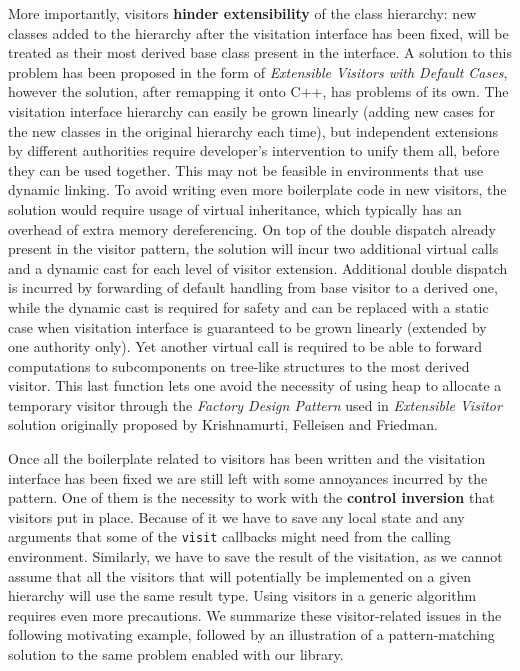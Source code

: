 \documentclass[preprint]{sigplanconf}
\makeatletter
\DeclareRobustCommand{\code}[1]{{\lstinline[breaklines=false,escapechar=@]{#1}}}
\makeatother
\begin{document}
More importantly, visitors {\bf hinder extensibility} of the class hierarchy: 
new classes added to the hierarchy after the visitation interface has been 
fixed, will be treated as their most derived base class present in the interface.
A solution to this problem has been proposed in the form of \emph{Extensible 
Visitors with Default Cases}\cite[]{Zenger:2001}, however the solution, after 
remapping it onto C++, has problems of its own. The visitation interface 
hierarchy can easily be grown linearly (adding new cases for the new classes in 
the original hierarchy each time), but independent extensions by different  
authorities require developer's intervention to unify them all, before they can 
be used together. This may not be feasible in environments that use dynamic 
linking. To avoid writing even more boilerplate code in new visitors, the 
solution would require usage of virtual inheritance, which typically has 
an overhead of extra memory dereferencing. On top of the double dispatch already 
present in the visitor pattern, the solution will incur two additional virtual 
calls and a dynamic cast for each level of visitor extension. Additional double 
dispatch is incurred by forwarding of default handling from base visitor to a 
derived one, while the dynamic cast is required for safety and can be replaced 
with a static case when visitation interface is guaranteed to be grown linearly 
(extended by one authority only). Yet another virtual call is required to be 
able to forward computations to subcomponents on tree-like structures to the 
most derived visitor. This last function lets one avoid the necessity of using 
heap to allocate a temporary visitor through the \emph{Factory Design 
Pattern}\cite{DesignPatterns1993} used in \emph{Extensible Visitor} solution 
originally proposed by Krishnamurti, Felleisen and Friedman\cite{Krishnamurthi98}.

Once all the boilerplate related to visitors has been written and the visitation 
interface has been fixed we are still left with some annoyances incurred by the 
pattern. One of them is the necessity to work with the {\bf control inversion} 
that visitors put in place. Because of it we have to save any local state and 
any arguments that some of the \code{visit} callbacks might need from the 
calling environment. Similarly, we have to save the result of the visitation, 
as we cannot assume that all the visitors that will potentially be implemented 
on a given hierarchy will use the same result type. Using visitors in a generic 
algorithm requires even more precautions. We summarize these visitor-related 
issues in the following motivating example, followed by an illustration of a 
pattern-matching solution to the same problem enabled with our library.
\end{document}
